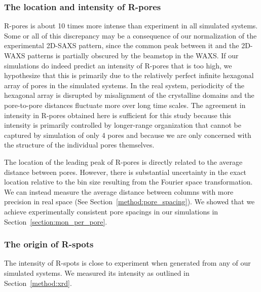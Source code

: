 \documentclass[journal=jpcbfk,manuscript=article]{achemso}
\begin{document}
  \subsubsection{The location and intensity of R-pores}\label{section:rpores}
  
  R-pores is about 10 times more intense than experiment in all simulated
  systems. Some or all of this discrepancy may be a consequence of our
  normalization of the experimental 2D-SAXS pattern, since the common peak
  between it and the 2D-WAXS patterns is partially obscured by the beamstop in
  the WAXS. If our simulations do indeed predict an intensity of R-pores that is
  too high, we hypothesize that this is primarily due to the relatively perfect
  infinite hexagonal array of pores in the simulated systems. In the real system,
  periodicity of the hexagonal array is disrupted by misalignment of the
  crystalline domains and the pore-to-pore distances fluctuate more over long
  time scales. The agreement in intensity in R-pores obtained here is sufficient for this
  study because this intensity is primarily controlled by longer-range
  organization that cannot be captured by simulation of only 4 pores and because
  we are only concerned with the structure of the individual pores themselves. 
  
  The location of the leading peak of R-pores is directly related to the
  average distance between pores. However, there is substantial uncertainty in
  the exact location relative to the bin size resulting from the Fourier space
  transformation. We can instead measure the average distance between columns
  with more precision in real space (See Section~\ref{method:pore_spacing}). We
  showed that we achieve experimentally consistent pore spacings in our
  simulations in Section~\ref{section:mon_per_pore}. 

  \subsubsection{The origin of R-spots}\label{section:rspots}
  
  The intensity of R-spots is close to experiment when generated from any of
  our simulated systems. We measured its intensity as outlined in Section~\ref{method:xrd}.
  
\end{document}
